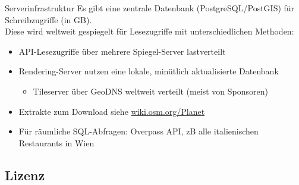 \documentclass{beamer}
\begin{document}
\begin{frame}{Serverinfrastruktur}
Es gibt eine zentrale Datenbank (PostgreSQL/PostGIS) für Schreibzugriffe (in GB).\\
\pause
Diese wird weltweit gespiegelt für Lesezugriffe mit unterschiedlichen Methoden:

\begin{itemize}
  \item API-Lesezugriffe über mehrere Spiegel-Server lastverteilt
  \item Rendering-Server nutzen eine lokale, minütlich aktualisierte Datenbank
  \begin{itemize}
    \item Tileserver über GeoDNS weltweit verteilt (meist von Sponsoren)
  \end{itemize}
  \item Extrakte zum Download siehe \href{http://wiki.osm.org/Planet}{wiki.osm.org/Planet}
  \item Für räumliche SQL-Abfragen: Overpass API, zB alle italienischen Restaurants in Wien
\end{itemize}

\end{frame}


\subsection{Lizenz}
\end{document}
